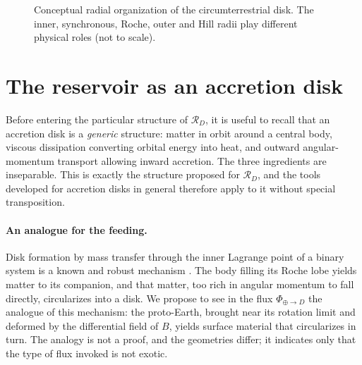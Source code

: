 \documentclass[11pt,a4paper,openany]{report}
\newcommand{\aR}{a_{\mathrm{Roche}}}
\newcommand{\RD}{\mathcal{R}_{D}}
\begin{document}
\begin{figure}[htbp]
\centering
{}
\caption{Conceptual radial organization of the circumterrestrial disk. The inner, synchronous,
Roche, outer and Hill radii play different physical roles (not to scale).}
\label{fig:radial}
\end{figure}

\section{The reservoir as an accretion disk}
\label{sec:disque-accretion}

Before entering the particular structure of $\RD$, it is useful to recall that an accretion disk is
a \emph{generic} structure: matter in orbit around a central body, viscous dissipation converting
orbital energy into heat, and outward angular-momentum transport allowing inward accretion. The
three ingredients are inseparable. This is exactly the structure proposed for $\RD$, and the tools
developed for accretion disks in general \cite{ShakuraSunyaev1973,Pringle1981,FrankKingRaine2002}
therefore apply to it without special transposition.

\paragraph{An analogue for the feeding.} Disk formation by mass transfer through the inner Lagrange
point of a binary system is a known and robust mechanism \cite{FrankKingRaine2002}. The body filling
its Roche lobe yields matter to its companion, and that matter, too rich in angular momentum to fall
directly, circularizes into a disk. We propose to see in the flux $\Phi_{\oplus\to D}$ the analogue
of this mechanism: the proto-Earth, brought near its rotation limit and deformed by the differential
field of $B$, yields surface material that circularizes in turn. The analogy is not a proof, and the
geometries differ; it indicates only that the type of flux invoked is not exotic.
\end{document}

